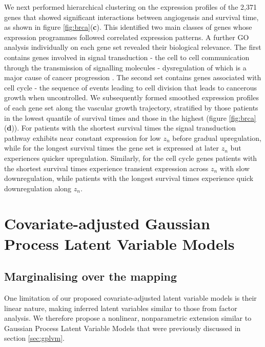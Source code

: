 We next performed hierarchical clustering on the expression profiles of the 2,371 genes that showed significant interactions between angiogensis and survival time, as shown in figure \ref{fig:brca}(\textbf{c}). This identified two main classes of genes whose expression programmes followed correlated expression patterns. %
A further GO analysis individually on each gene set revealed their biological relevance.
The first contains genes involved in signal transduction - the cell to cell communication through the transmission of signalling molecules - dysregulation of which is a major cause of cancer progression \citep{Sever2015-ru}.
The second set contains genes associated with cell cycle - the sequence of events leading to cell division that leads to cancerous growth when uncontrolled. We subsequently formed smoothed expression profiles of each gene set along the vascular growth trajectory, stratified by those patients in the lowest quantile of survival times and those in the highest (figure \ref{fig:brca}(\textbf{d})). For patients with the shortest survival times the signal transduction pathway exhibits near constant expression for low $z_n$ before gradual upregulation, while for the longest survival times the gene set is expressed at later $z_n$ but experiences quicker upregulation. Similarly, for the cell cycle genes patients with the shortest survival times experience transient expression across $z_n$ with slow downregulation, while patients with the longest survival times experience quick downregulation along $z_n$.

\section{Covariate-adjusted Gaussian Process Latent Variable Models}


\subsection{Marginalising over the mapping}

One limitation of our proposed covariate-adjusted latent variable models is their linear nature, making inferred latent variables similar to those from factor analysis. We therefore propose a nonlinear, nonparametric extension similar to Gaussian Process Latent Variable Models \citep{Lawrence2005-cu} that were previously discussed in section \ref{sec:gplvm}.


